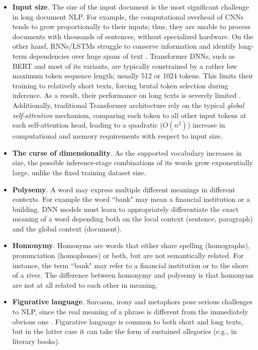 \documentclass[preprint,review,10pt]{elsarticle}
\begin{document}
	\begin{itemize}
		\item \textbf{Input size}. The size of the input document is the most significant challenge in long document NLP. For example, the computational overhead of CNNs tends to grow proportionally to their inputs; thus, they are unable to process documents with thousands of sentences, without specialized hardware. On the other hand, RNNs/LSTMs struggle to conserve information and identify long-term dependencies over huge spans of text \cite{worsham_book}. Transformer DNNs, such as BERT and most of its variants, are typically constrained by a rather low maximum token sequence length; usually 512 or 1024 tokens. This limits their training to relatively short texts, forcing brutal token selection during inference. As a result, their performance on long texts is severely limited \cite{dai}. Additionally, traditional Transformer architecture \cite{ilia} rely on the typical \textit{global self-attention} mechanism, comparing each token to all other input tokens at each self-attention head, leading to a quadratic ($O(n^2)$) increase in computational and memory requirements with respect to input size.
		
		\item \textbf{The curse of dimensionality}. As the supported vocabulary increases in size, the possible inference-stage combinations of its words grow exponentially large, unlike the fixed training dataset size.
		
		\item \textbf{Polysemy}. A word may express multiple different meanings in different contexts. For example the word ``bank" may mean a financial institution or a building. DNN models must learn to appropriately differentiate the exact meaning of a word depending both on the local context (sentence, paragraph) and the global context (document).
		
		\item \textbf{Homonymy}. Homonyms are words that either share spelling (homographs), pronunciation (homophones) or both, but are not semantically related. For instance, the term ``bank" may refer to a financial institution or to the shore of a river. The difference between homonymy and polysemy is that homonyms are not at all related to each other in meaning.
		
		\item \textbf{Figurative language}. Sarcasm, irony and metaphors pose serious challenges to NLP, since the real meaning of a phrase is different from the immediately obvious one \cite{Karamouzas2022}. Figurative language is common to both short and long texts, but in the latter case it can take the form of sustained allegories (e.g., in literary books).
		

\end{itemize}
\end{document}
